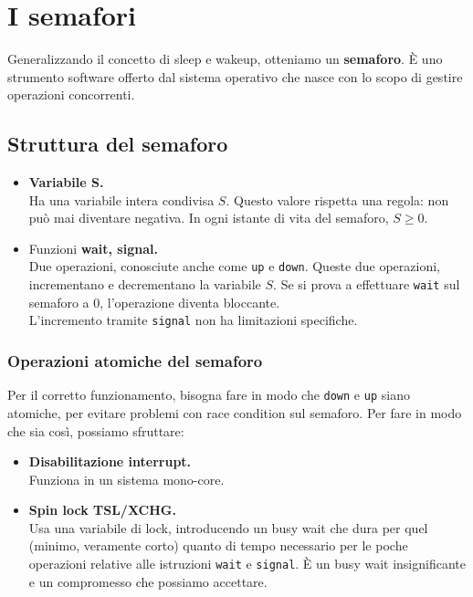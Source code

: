 \documentclass{report}
\begin{document}
\section{I semafori}
Generalizzando il concetto di sleep e wakeup, otteniamo un \textbf{semaforo}.
È uno strumento software offerto dal sistema operativo che nasce con lo scopo di gestire operazioni concorrenti.

\subsection{Struttura del semaforo}

\begin{itemize}
    \item \textbf{Variabile S.}\\
    Ha una variabile intera condivisa $S$. Questo valore rispetta una regola: non può mai diventare negativa. In ogni istante di vita del semaforo, $S \geq 0$.

    \item Funzioni \textbf{wait, signal.}\\
    Due operazioni, conosciute anche come \verb|up| e \verb|down|.
    Queste due operazioni, incrementano e decrementano la variabile $S$.
    Se si prova a effettuare \verb|wait| sul semaforo a 0, l'operazione diventa bloccante.\\
    L'incremento tramite \verb|signal| non ha limitazioni specifiche. 
\end{itemize}

\subsubsection{Operazioni atomiche del semaforo}
Per il corretto funzionamento, bisogna fare in modo che \verb|down| e \verb|up| siano atomiche, per evitare problemi con race condition sul semaforo.
Per fare in modo che sia così, possiamo sfruttare:
\begin{itemize}
    \item \textbf{Disabilitazione interrupt.}\\
    Funziona in un sistema mono-core.
    \item \textbf{Spin lock TSL/XCHG.}\\
    Usa una variabile di lock, introducendo un busy wait che dura per quel (minimo, veramente corto) quanto di tempo necessario per le poche operazioni relative alle istruzioni \verb|wait| e \verb|signal|. È un busy wait insignificante e un compromesso che possiamo accettare.
\end{itemize}
\end{document}
